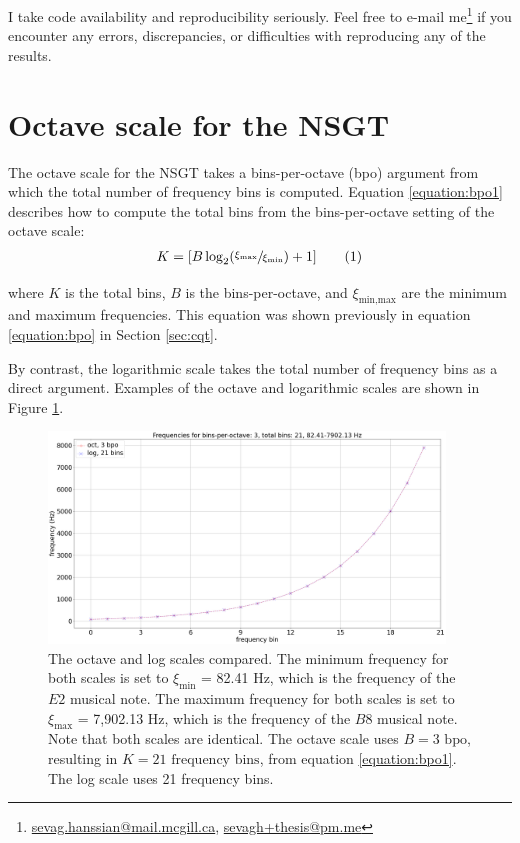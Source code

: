 \documentclass[report.tex]{subfiles}
\begin{document}
\begin{appendices}
I take code availability and reproducibility seriously. Feel free to e-mail me\footnote{\href{mailto:sevag.hanssian@mail.mcgill.ca}{sevag.hanssian@mail.mcgill.ca}, \href{mailto:sevagh+thesis@pm.me}{sevagh+thesis@pm.me}} if you encounter any errors, discrepancies, or difficulties with reproducing any of the results.

\newpagefill

\section{Octave scale for the NSGT}
\label{appendix:octscale}

The octave scale for the NSGT takes a bins-per-octave (bpo) argument from which the total number of frequency bins is computed. Equation \eqref{equation:bpo1} describes how to compute the total bins from the bins-per-octave setting of the octave scale:
\begin{align}
	K = [B \log_{2}(\sfrac{\xi_{\text{max}}}{\xi_{\text{min}}}) + 1]\tag{1}\label{equation:bpo1}
\end{align}

where $K$ is the total bins, $B$ is the bins-per-octave, and $\xi_{\text{min,max}}$ are the minimum and maximum frequencies. This equation was shown previously in equation \eqref{equation:bpo} in Section \ref{sec:cqt}.

By contrast, the logarithmic scale takes the total number of frequency bins as a direct argument. Examples of the octave and logarithmic scales are shown in Figure \ref{fig:octvlog}.

\begin{figure}[ht]
	\centering
	\includegraphics[width=0.9375\textwidth]{./images-freqscales/log_vs_oct.png}
	\caption{The octave and log scales compared. The minimum frequency for both scales is set to $\xi_{\text{min}}$ = 82.41 Hz, which is the frequency of the $E2$ musical note. The maximum frequency for both scales is set to $\xi_{\text{max}}$ = 7,902.13 Hz, which is the frequency of the $B8$ musical note. Note that both scales are identical. The octave scale uses $B = 3 \text{ bpo}$, resulting in $K = 21 \text{ frequency bins}$, from equation \eqref{equation:bpo1}. The log scale uses 21 frequency bins.}
	\label{fig:octvlog}
\end{figure}


\end{appendices}
\end{document}
